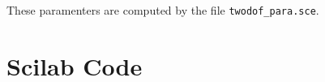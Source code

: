 These paramenters are computed by the file {\tt twodof\_para.sce}. 

\section{Scilab Code}\label{prbscodes}
\begin{code}

\end{code}

\begin{code}

\end{code}


\begin{code}

\end{code}


\begin{code}

\end{code}


% 
